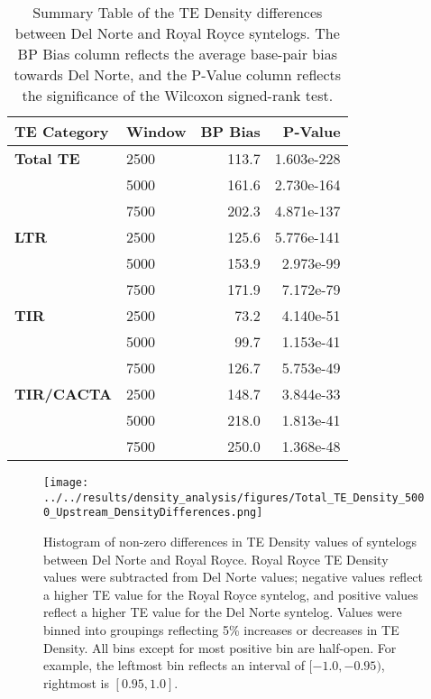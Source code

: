 \documentclass[fleqn,10pt]{olplainarticle}
\begin{document}
\begin{table}[ht]
\centering
\begin{tabularx}{\textwidth}{l|X|r|r}
\toprule
\textbf{TE Category} & \textbf{Window} & \textbf{BP Bias} & \textbf{P-Value} \\
\toprule
\textbf{Total TE} & 2500 & 113.7 & 1.603e-228 \\
& 5000 & 161.6 & 2.730e-164 \\
& 7500 & 202.3 & 4.871e-137 \\
\hline
\textbf{LTR} & 2500 & 125.6 & 5.776e-141 \\
& 5000 & 153.9 & 2.973e-99 \\
& 7500 & 171.9 & 7.172e-79 \\
\hline
\textbf{TIR} & 2500 & 73.2 & 4.140e-51 \\
& 5000 & 99.7 & 1.153e-41 \\
& 7500 & 126.7 & 5.753e-49 \\
\hline
\textbf{TIR/CACTA} & 2500 & 148.7 & 3.844e-33 \\
& 5000 & 218.0 & 1.813e-41 \\
& 7500 & 250.0 & 1.368e-48 \\
\bottomrule
\end{tabularx}
\caption{Summary Table of the TE Density differences between Del Norte and Royal Royce syntelogs. The BP Bias column reflects the average base-pair bias towards Del Norte, and the P-Value column reflects the significance of the Wilcoxon signed-rank test.}
\label{tab:syntelog_summary}
\end{table}


\begin{figure}[ht]
\centering
\texttt{[image: ../../results/density\_analysis/figures/Total\_TE\_Density\_5000\_Upstream\_DensityDifferences.png]}
\caption{
Histogram of non-zero differences in TE Density values of syntelogs between Del Norte and Royal Royce.
Royal Royce TE Density values were subtracted from Del Norte values; negative values reflect a higher TE value for the Royal Royce syntelog, and positive values reflect a higher TE value for the Del Norte syntelog.
Values were binned into groupings reflecting 5\% increases or decreases in TE Density.
All bins except for most positive bin are half-open.
For example, the leftmost bin reflects an interval of $[-1.0, -0.95)$, rightmost is $[0.95, 1.0]$.
}
\label{fig:syntelog_5000_total}
\end{figure}
\end{document}

